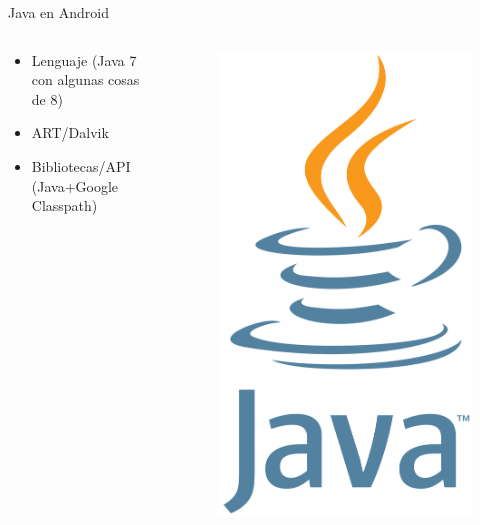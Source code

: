 \documentclass[aspectratio=169]{beamer}
\begin{document}
\begin{frame}[fragile]{Java en Android}

    \begin{columns}
        \begin{column}{0.5\textwidth}
            \begin{itemize}
                \item Lenguaje (Java 7 con algunas cosas de 8)
                \item ART/Dalvik
                \item Bibliotecas/API (Java+Google Classpath)
            \end{itemize}
        \end{column}
        \begin{column}{0.5\textwidth}  %
            \begin{figure}
                \centering
                \includegraphics[width=0.4\linewidth]{Images/java}
            \end{figure}
        \end{column}
    \end{columns}


\end{frame}
\end{document}

